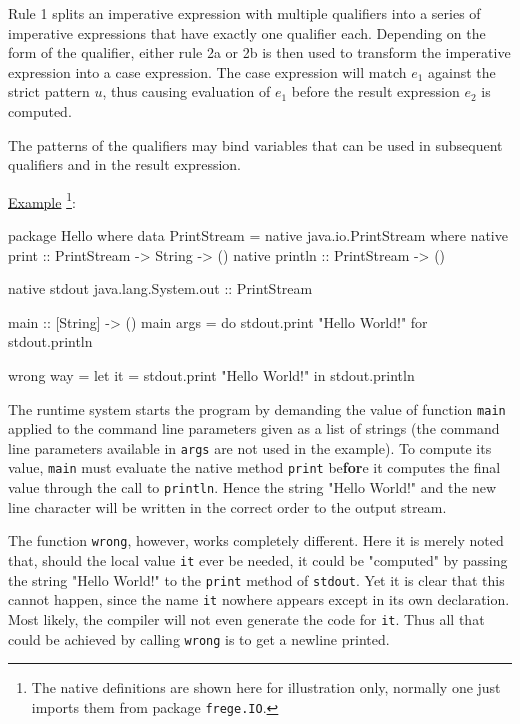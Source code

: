 Rule 1 splits an imperative expression with multiple qualifiers into a series of imperative expressions that have exactly one qualifier each.
Depending on the form of the qualifier, either rule 2a or 2b is then used to transform the imperative expression into a case expression.
The case expression will match $e_1$ against the strict pattern $u$, thus causing evaluation of $e_1$ before the result expression $e_2$ is computed.

The patterns of the qualifiers may bind variables that can be used in subsequent qualifiers and in the result expression.

\underline{Example}
\footnote{The native definitions are shown here for illustration only, normally one just imports them from package \texttt{frege.IO}.}:
\begin{code}
package Hello where
    data PrintStream = native java.io.PrintStream where
        native print   :: PrintStream -> String -> ()
        native println :: PrintStream -> ()

   native stdout java.lang.System.out :: PrintStream

   main :: [String] -> ()
   main args = do
        stdout.print "Hello World!"
    for stdout.println

   wrong way = let
        it = stdout.print "Hello World!"
     in stdout.println
\end{code}

The runtime system starts the program by demanding the value of function \texttt{main} applied to the command line parameters given as a list of strings (the command line parameters available in \texttt{args} are not used in the example). To compute its value, \texttt{main} must evaluate the native method \texttt{print} be\textbf{for}e it computes the final value through the call to \texttt{println}. Hence the string "Hello World!" and the new line character will be written in the correct order to the output stream.

The function \texttt{wrong}, however, works completely different.
Here it is merely noted that, should the local value \texttt{it} ever be needed, it could be "computed" by passing the string "Hello World!" to the \texttt{print} method of \texttt{stdout}.
Yet it is clear that this cannot happen, since the name \texttt{it} nowhere appears except in its own declaration. Most likely, the compiler will not even generate the code for \texttt{it}. Thus all that could be achieved by calling \texttt{wrong} is to get a newline printed.

